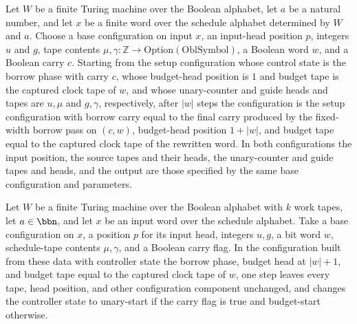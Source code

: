\begin{lemma}
\label{Complexity.setupCfg_borrow}
\leanok
{}
Let $W$ be a finite Turing machine over the Boolean alphabet, let $a$ be a natural
number, and let $x$ be a finite word over the schedule alphabet determined by $W$ and
$a$. Choose a base configuration on input $x$, an input-head position $p$, integers $u$
and $g$, tape contents
$\mu,\gamma\colon\mathbb{Z}\to\mathrm{Option}(\mathrm{OblSymbol})$, a Boolean word $w$,
and a Boolean carry $c$. Starting from the setup configuration whose control state is
the borrow phase with carry $c$, whose budget-head position is $1$ and budget tape is
the captured clock tape of $w$, and whose unary-counter and guide heads and tapes are
$u,\mu$ and $g,\gamma$, respectively, after $|w|$ steps the configuration is the setup
configuration with borrow carry equal to the final carry produced by the fixed-width
borrow pass on $(c,w)$, budget-head position $1+|w|$, and budget tape equal to the
captured clock tape of the rewritten word. In both configurations the input position,
the source tapes and their heads, the unary-counter and guide tapes and heads, and the
output are those specified by the same base configuration and parameters.
\end{lemma}

\begin{lemma}
\label{Complexity.setupCfg_borrow_end}
\leanok
{}
Let $W$ be a finite Turing machine over the Boolean alphabet with $k$ work tapes, let $a
\in \bbn$, and let $x$ be an input word over the schedule alphabet. Take a base
configuration on $x$, a position $p$ for its input head, integers $u,g$, a bit word $w$,
schedule-tape contents $\mu,\gamma$, and a Boolean carry flag. In the configuration
built from these data with controller state the borrow phase, budget head at $|w|+1$,
and budget tape equal to the captured clock tape of $w$, one step leaves every tape,
head position, and other configuration component unchanged, and changes the controller
state to unary-start if the carry flag is true and budget-start otherwise.
\end{lemma}

